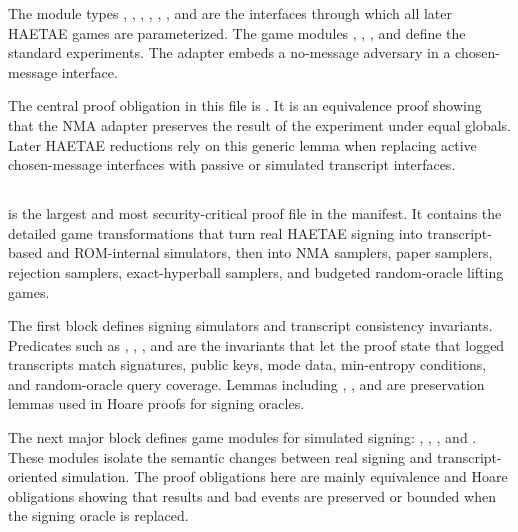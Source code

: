 The module types , , ,
, , , and
 are the interfaces through which all later HAETAE games
are parameterized.  The game modules , ,
, and  define the standard experiments.  The
adapter  embeds a no-message adversary in a chosen-message
interface.

The central proof obligation in this file is
.  It is an equivalence proof showing that the NMA
adapter preserves the result of the experiment under equal globals.  Later
HAETAE reductions rely on this generic lemma when replacing active chosen-message
interfaces with passive or simulated transcript interfaces.

\subsection[HAETAE\_HopGames.ec]{\texorpdfstring{}{HAETAE\_HopGames.ec}}

 is the largest and most security-critical proof
file in the manifest.  It contains the detailed game transformations that turn
real HAETAE signing into transcript-based and ROM-internal simulators, then into
NMA samplers, paper samplers, rejection samplers, exact-hyperball samplers, and
budgeted random-oracle lifting games.

The first block defines signing simulators and transcript consistency
invariants.  Predicates such as ,
, , and
 are the invariants that let the proof state that
logged transcripts match signatures, public keys, mode data, min-entropy
conditions, and random-oracle query coverage.  Lemmas including
,
, and
 are preservation
lemmas used in Hoare proofs for signing oracles.

The next major block defines game modules for simulated signing:
,
,
, and
.  These modules isolate the
semantic changes between real signing and transcript-oriented simulation.  The
proof obligations here are mainly equivalence and Hoare obligations showing
that results and bad events are preserved or bounded when the signing oracle is
replaced.

